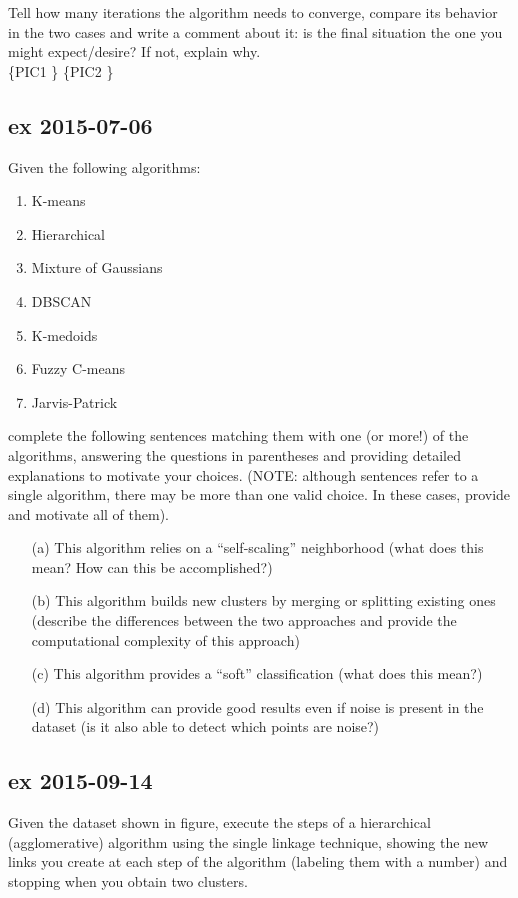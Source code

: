 \documentclass[a4paper,12pt,titlepage]{article} %
\begin{document}
Tell how many iterations the algorithm needs to converge, compare its behavior in the two cases and write a comment about it: is the final situation the one you might expect/desire? If not, explain why.\\

\{PIC1 \} \{PIC2 \}

\subsection{ex 2015-07-06}
Given the following algorithms:
\begin{enumerate}
\item K-means
\item Hierarchical
\item Mixture of Gaussians
\item DBSCAN
\item K-medoids
\item Fuzzy C-means
\item Jarvis-Patrick
\end{enumerate}
complete the following sentences matching them with one (or more!) of the algorithms, answering the questions in parentheses and providing detailed explanations to motivate your choices. (NOTE: although sentences refer to a single algorithm, there may be more than one valid choice. In these cases, provide and motivate all of them).
\begin{enumerate}
\item[(a)] This algorithm relies on a “self-scaling” neighborhood (what does this mean? How can this be accomplished?)
\item[(b)] This algorithm builds new clusters by merging or splitting existing ones (describe the differences between the two approaches and provide the computational complexity of this approach)
\item[(c)] This algorithm provides a “soft” classification (what does this mean?)
\item[(d)] This algorithm can provide good results even if noise is present in the dataset (is it also able to detect which points are noise?)
\end{enumerate}

\subsection{ex 2015-09-14}
Given the dataset shown in figure, execute the steps of a hierarchical (agglomerative)
algorithm using the single linkage technique, showing the new links you create at each
step of the algorithm (labeling them with a number) and stopping when you obtain two
clusters.\\
\end{document}
